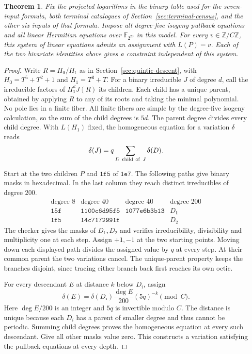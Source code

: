 \documentclass[11pt]{article}
\newtheorem{theorem}{Theorem}
\begin{document}
\begin{theorem}
Fix the projected logarithms in the binary table used for the
seven-input formula, both terminal catalogues of
Section~\ref{sec:terminal-census}, and the other six inputs of that
formula. Impose all degree-five isogeny pullback equations and all
linear Hermitian equations over \(\mathbb F_{2^{20}}\) in this model.
For every \(v\in\mathbb Z/C\mathbb Z\), this system of linear
equations admits an assignment with \(L(P)=v\). Each of the two
bivariate identities above gives a constraint independent of this
system.
\end{theorem}
\begin{proof}
Write \(R=H_0/H_1\) as in Section~\ref{sec:quintic-descent}, with
\(H_0=T^5+T^2+1\) and \(H_1=T^3+T\). For a binary irreducible
\(J\) of degree \(d\), call the irreducible factors of
\(H_1^d J(R)\) its children. Each child has a unique parent, obtained
by applying \(R\) to any of its roots and taking the minimal polynomial.
No pole lies in a finite fiber. All finite fibers are simple by the
degree-five isogeny calculation, so the sum of the child degrees is \(5d\).
The parent degree divides every child degree. With \(L(H_1)\) fixed,
the homogeneous equation for a variation \(\delta\) reads
\[
                   \delta(J)=q\sum_{D\ {\rm child\ of}\ J}\delta(D).
\]

Start at the two children \(P\) and \(\mathtt{1f5}\) of
\(\mathtt{1e7}\). The following paths give binary masks in hexadecimal.
In the last column they reach distinct irreducibles of degree 200.
\[
\begin{array}{c|c|c|c}
 \text{degree 8}&\text{degree 40}&\text{degree 40}&\text{degree 200}\\ \hline
 \mathtt{15f}&\mathtt{1100c6d95f5}&\mathtt{1077e6b3b13}&D_1\\
 \mathtt{1f5}&\mathtt{14c7172991f}& &D_2
\end{array}
\]
The checker gives the masks of \(D_1,D_2\) and verifies irreducibility,
divisibility and multiplicity one at each step. Assign \(+1,-1\)
at the two starting points. Moving down each displayed path divides
the assigned value by \(q\) at every step. At their common parent the
two variations cancel. The unique-parent property keeps the branches
disjoint, since tracing either branch back first reaches its own octic.

For every descendant \(E\) at distance \(k\) below \(D_i\), assign
\[
          \delta(E)=\delta(D_i)\frac{\deg E}{200}(5q)^{-k}\pmod C.
\]
Here \(\deg E/200\) is an integer and \(5q\) is invertible modulo \(C\).
The distance is unique because each \(D_i\) has a parent of smaller
degree and thus cannot be periodic. Summing child degrees proves the
homogeneous equation at every such descendant. Give all other masks
value zero. This constructs a variation satisfying the pullback
equations at every depth.


\end{proof}
\end{document}
